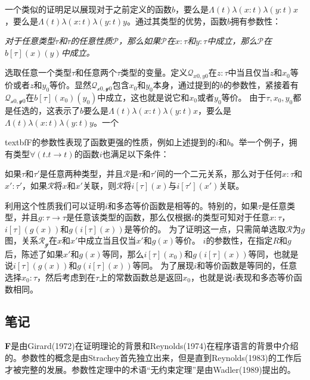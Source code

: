 一个类似的证明足以展现对于之前定义的函数$b$，要么是$\Lambda (t) \lambda (x:t) \lambda (y:t) x$，要么是$\Lambda (t) \lambda (x:t) \lambda (y:t) y$。通过其类型的优势，函数$b$拥有参数性：
\begin{center}
  \textit{对于任意类型$\tau$和$\tau$的任意性质$\mathcal{P}$，那么如果$\mathcal{P}$在$x:\tau$和$y:\tau$中成立，那么$\mathcal{P}$在$b[\tau](x)(y)$中成立。}
\end{center}

选取任意一个类型$\tau$和任意两个$\tau$类型的变量。定义$\mathcal{Q}_{x0,y0}$在$z:\tau$中当且仅当$z$和$x_0$等价或者$z$和$y_0$等价。显然$\mathcal{Q_{x0,y0}}$包含$x_0$和$y_0$本身，通过提到的$b$的参数性，紧接着有$\mathcal{Q_{x0,y0}}$在$b[\tau](x_0)(y_0)$中成立，这也就是说它和$x_0$或者$y_0$等价。
由于$\tau, x_0, y_0$都是任选的，这表示了$b$要么是$\Lambda (t) \lambda (x:t) \lambda (y:t) x$，要么是$\Lambda (t) \lambda (x:t) \lambda (y:t) y$。一个

textbf{F}的参数性表现了函数更强的性质，例如上述提到的$i$和$b$。举一个例子，拥有类型$\forall (t.t \to t)$的函数$i$也满足以下条件：
\begin{center}
  如果$\tau$和$\tau'$是任意两种类型，并且$\mathcal{R}$是$\tau$和$\tau'$间的一个二元关系，那么对于任何$x:\tau$和$x':\tau'$，如果$\mathcal{R}$将$x$和$x'$关联，则$\mathcal{R}$将$i[\tau](x)$与$i[\tau'](x')关联。$
\end{center}

利用这个性质我们可以证明$i$和多态等价函数是相等的。特别的，如果$\tau$是任意类型，并且$g:\tau \to \tau$是任意该类型的函数，那么仅根据$i$的类型可知对于任意$x:\tau$，$i[\tau](g(x))$和$g(i[\tau](x))$是等价的。
为了证明这一点，只需简单选取$\mathcal{R}$为$g$图，关系$\mathcal{R_{g}}$在$x$和$x'$中成立当且仅当$x'$和$g(x)$等价。
$i$的参数性，在指定$R$和$g$后，陈述了如果$x'$和$g(x)$等同，那么$i[\tau](x_0)$和$g(i[\tau](x))$等同，也就是说$i[\tau](g(x))$和$g(i[\tau](x))$等同。
为了展现$i$和等价函数是等同的，任意选择$x_0:\tau$，然后考虑到在$\tau$上的常数函数总是返回$x_0$，也就是说$i$表现和多态等价函数相同。

\subsection{笔记}
\textbf{F}是由Girard(1972)在证明理论的背景和Reynolds(1974)在程序语言的背景中介绍的。参数性的概念是由Strachey首先独立出来，但是直到Reynolds(1983)的工作后才被完整的发展。参数性定理中的术语“无约束定理”是由Wadler(1989)提出的。

